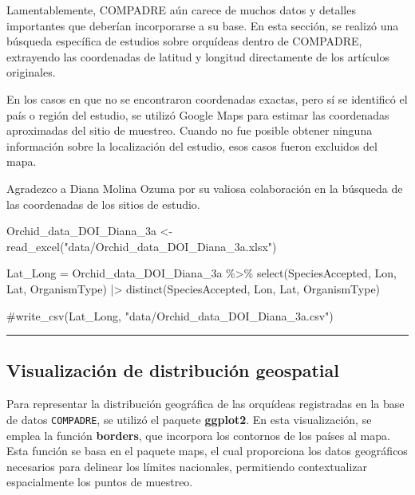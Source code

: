 \documentclass[
  12pt,
  letterpaper,
]{book}
\newenvironment{Shaded}{\begin{snugshade}}{\end{snugshade}}
\newcommand{\CommentTok}[1]{\textcolor[rgb]{0.37,0.37,0.37}{#1}}
\newcommand{\FunctionTok}[1]{\textcolor[rgb]{0.28,0.35,0.67}{#1}}
\newcommand{\NormalTok}[1]{\textcolor[rgb]{0.00,0.23,0.31}{#1}}
\newcommand{\OtherTok}[1]{\textcolor[rgb]{0.00,0.23,0.31}{#1}}
\newcommand{\SpecialCharTok}[1]{\textcolor[rgb]{0.37,0.37,0.37}{#1}}
\newcommand{\StringTok}[1]{\textcolor[rgb]{0.13,0.47,0.30}{#1}}
\begin{document}
Lamentablemente, COMPADRE aún carece de muchos datos y detalles
importantes que deberían incorporarse a su base. En esta sección, se
realizó una búsqueda específica de estudios sobre orquídeas dentro de
COMPADRE, extrayendo las coordenadas de latitud y longitud directamente
de los artículos originales.

En los casos en que no se encontraron coordenadas exactas, pero sí se
identificó el país o región del estudio, se utilizó Google Maps para
estimar las coordenadas aproximadas del sitio de muestreo. Cuando no fue
posible obtener ninguna información sobre la localización del estudio,
esos casos fueron excluidos del mapa.

Agradezco a Diana Molina Ozuma por su valiosa colaboración en la
búsqueda de las coordenadas de los sitios de estudio.

\begin{Shaded}
\begin{Highlighting}[]
\NormalTok{Orchid\_data\_DOI\_Diana\_3a }\OtherTok{\textless{}{-}} \FunctionTok{read\_excel}\NormalTok{(}\StringTok{"data/Orchid\_data\_DOI\_Diana\_3a.xlsx"}\NormalTok{)}
\end{Highlighting}
\end{Shaded}

\begin{Shaded}
\begin{Highlighting}[]
\NormalTok{Lat\_Long }\OtherTok{=}\NormalTok{ Orchid\_data\_DOI\_Diana\_3a }\SpecialCharTok{\%\textgreater{}\%}
  \FunctionTok{select}\NormalTok{(SpeciesAccepted, Lon, Lat, OrganismType) }\SpecialCharTok{|\textgreater{}}
  \FunctionTok{distinct}\NormalTok{(SpeciesAccepted, Lon, Lat, OrganismType)}

\CommentTok{\#write\_csv(Lat\_Long, "data/Orchid\_data\_DOI\_Diana\_3a.csv")}
\end{Highlighting}
\end{Shaded}

\begin{center}\rule{0.5\linewidth}{0.5pt}\end{center}

\subsection{Visualización de distribución
geospatial}\label{visualizaciuxf3n-de-distribuciuxf3n-geospatial}

Para representar la distribución geográfica de las orquídeas registradas
en la base de datos \texttt{COMPADRE}, se utilizó el paquete
\textbf{ggplot2}. En esta visualización, se emplea la función
\textbf{borders}, que incorpora los contornos de los países al mapa.
Esta función se basa en el paquete maps, el cual proporciona los datos
geográficos necesarios para delinear los límites nacionales, permitiendo
contextualizar espacialmente los puntos de muestreo.
\end{document}
